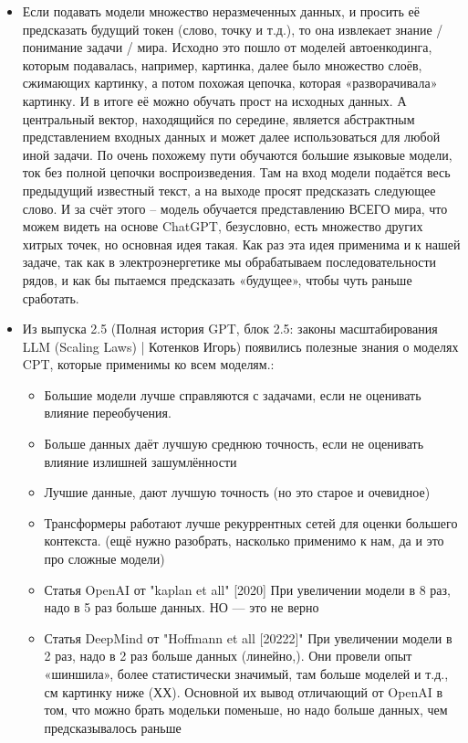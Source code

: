 \begin{itemize}
\item Если подавать модели множество неразмеченных данных, и просить её предсказать будущий токен (слово, точку и т.д.), то она извлекает знание / понимание задачи / мира. Исходно это пошло от моделей автоенкодинга, которым подавалась, например, картинка, далее было множество слоёв, сжимающих картинку, а потом похожая цепочка, которая «разворачивала» картинку. И в итоге её можно обучать прост на исходных данных. А центральный вектор, находящийся по середине, является абстрактным представлением входных данных и может далее использоваться для любой иной задачи. По очень похожему пути обучаются большие языковые модели, ток без полной цепочки воспроизведения. Там на вход модели подаётся весь предыдущий известный текст, а на выходе просят предсказать следующее слово. И за счёт этого – модель обучается представлению ВСЕГО мира, что можем видеть на основе ChatGPT, безусловно, есть множество других хитрых точек, но основная идея такая. Как раз эта идея применима и к нашей задаче, так как в электроэнергетике мы обрабатываем последовательности рядов, и как бы пытаемся предсказать «будущее», чтобы чуть раньше сработать.

\item Из выпуска 2.5 (Полная история GPT, блок 2.5: законы масштабирования LLM (Scaling Laws) | Котенков Игорь) появились полезные знания о моделях CPT, которые применимы ко всем моделям.:

\begin{itemize}
\item Большие модели лучше справляются с задачами, если не оценивать влияние переобучения.
\item Больше данных даёт лучшую среднюю точность, если не оценивать влияние излишней зашумлённости
\item Лучшие данные, дают лучшую точность (но это старое и очевидное)
\item Трансформеры работают лучше рекуррентных сетей для оценки большего контекста. (ещё нужно разобрать, насколько применимо к нам, да и это про сложные модели)
\item Статья OpenAI от "kaplan et all" [2020] При увеличении модели в 8 раз, надо в 5 раз больше данных. НО — это не верно
\item Статья DeepMind от "Hoffmann et all [20222]" При увеличении модели в 2 раз, надо в 2 раз больше данных (линейно,). Они провели опыт «шиншила», более статистически значимый, там больше моделей и т.д., см картинку ниже (ХХ). Основной их вывод отличающий от OpenAI в том, что можно брать модельки поменьше, но надо больше данных, чем предсказывалось раньше
\end{itemize}
\end{itemize}

